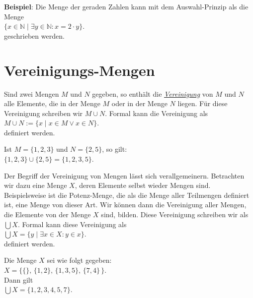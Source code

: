 \noindent
\textbf{Beispiel}:
Die Menge der geraden Zahlen kann mit dem Auswahl-Prinzip als die Menge 
\\[0.2cm]
\hspace*{1.3cm}
 $\{ x \in \mathbb{N} \;|\; \exists y\in \mathbb{N}: x = 2 \cdot y \}$. 
\\[0.2cm]
geschrieben werden.

\section{Vereinigungs-Mengen}
Sind zwei Mengen $M$ und $N$ gegeben, so enth\"{a}lt die 
\href{https://de.wikipedia.org/wiki/Menge_(Mathematik)#Vereinigung_.28Vereinigungsmenge.29}{\emph{Vereinigung}}
von $M$ und $N$ alle Elemente, die  
 in der Menge $M$ oder in der Menge $N$ liegen.  F\"{u}r diese Vereinigung schreiben wir $M \cup N$.
Formal kann die Vereinigung als 
\\[0.2cm]
\hspace*{1.3cm} $M \cup N := \{ x \;|\; x \in M \vee x \in N \}$. 
\\[0.2cm] 
definiert werden.

\example 
Ist  $M = \{1,2,3\}$ und $N = \{2,5\}$, so gilt: \\[0.2cm]
\hspace*{1.3cm} $\{1,2,3\} \cup \{2,5\} = \{1,2,3,5\}$.  \eox


Der Begriff der Vereinigung von Mengen l\"{a}sst sich verallgemeinern.  Betrachten
wir dazu eine Menge $X$, deren Elemente selbst wieder Mengen sind. Beispielsweise ist die
Potenz-Menge, die als die Menge aller Teilmengen definiert ist,   
eine Menge von dieser Art.  Wir k\"{o}nnen dann die Vereinigung aller Mengen, die Elemente
von der Menge $X$ sind, bilden.  Diese Vereinigung schreiben wir als $\bigcup X$.  Formal
kann diese Vereinigung als
\\[0.2cm]
\hspace*{1.3cm} $\bigcup X = \{ y \;|\; \exists x \in X: y \in x \}$.
\\[0.2cm]
 definiert werden.

\example
Die Menge $X$ sei wie folgt gegeben: \\[0.2cm]
\hspace*{1.3cm}
 $X = \big\{ \{\},\, \{1,2\}, \, \{1,3,5\}, \, \{7,4\}\,\big\}$. \\[0.2cm]
Dann gilt \\[0.2cm]
\hspace*{1.3cm}
 $\bigcup X = \{ 1, 2, 3, 4, 5, 7 \}$. \eoxs

